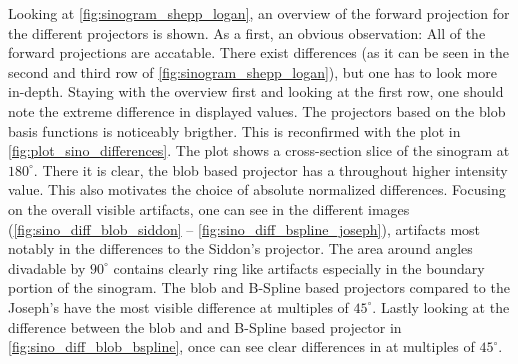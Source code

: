 Looking at \autoref{fig:sinogram_shepp_logan}, an overview of the forward projection for the
different projectors is shown. As a first, an obvious observation: All of the forward projections
are accatable. There exist differences (as it can be seen in the second and third row of
\autoref{fig:sinogram_shepp_logan}), but one has to look more in-depth. Staying with the overview
first and looking at the first row, one should note the extreme difference in displayed values. The
projectors based on the blob basis functions is noticeably brigther. This is reconfirmed with the
plot in \autoref{fig:plot_sino_differences}. The plot shows a cross-section slice of the sinogram at
\(180^\circ\). There it is clear, the blob based projector has a throughout higher intensity value.
This also motivates the choice of absolute normalized differences. Focusing on the overall visible
artifacts, one can see in the different images
(\autoref{fig:sino_diff_blob_siddon} -- \autoref{fig:sino_diff_bspline_joseph}), artifacts most
notably in the differences to the Siddon's projector. The area around angles divadable by
\(90^\circ\) contains clearly ring like artifacts especially in the boundary portion of the
sinogram. The blob and B-Spline based projectors compared to the Joseph's have the most visible
difference at multiples of \(45^\circ\).
Lastly looking at the difference between the blob and and B-Spline based projector in
\autoref{fig:sino_diff_blob_bspline}, once can see clear differences in at multiples of
\(45^\circ\).

